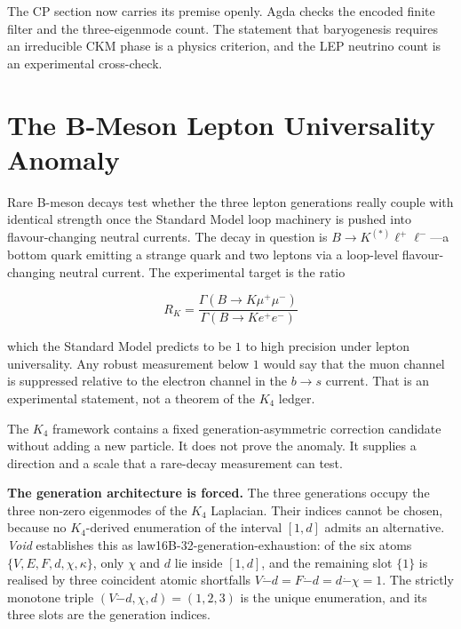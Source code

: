 \documentclass[11pt,a4paper]{book}
\def\texttt#1{#1}%
\begin{document}
The CP section now carries its premise openly.  Agda checks the encoded finite
filter and the three-eigenmode count.  The statement that baryogenesis requires
an irreducible CKM phase is a physics criterion, and the LEP neutrino count is
an experimental cross-check.

\section{The B-Meson Lepton Universality Anomaly}
\label{sec:b-meson-anomaly}

Rare B-meson decays test whether the three lepton generations really couple with identical strength once the Standard Model loop machinery is pushed into flavour-changing neutral currents. The decay in question is $B \to K^{(*)} \ell^+ \ell^-$---a bottom quark emitting a strange quark and two leptons via a loop-level flavour-changing neutral current. The experimental target is the ratio

\[
  R_K = \frac{\Gamma(B \to K \mu^+\mu^-)}{\Gamma(B \to K e^+e^-)}
\]

which the Standard Model predicts to be $1$ to high precision under lepton universality.  Any robust measurement below $1$ would say that the muon channel is suppressed relative to the electron channel in the $b \to s$ current.  That is an experimental statement, not a theorem of the $K_4$ ledger.

The $K_4$ framework contains a fixed generation-asymmetric correction candidate without adding a new particle.  It does not prove the anomaly.  It supplies a direction and a scale that a rare-decay measurement can test.

\textbf{The generation architecture is forced.} The three generations occupy the three non-zero eigenmodes of the $K_4$ Laplacian. Their indices cannot be chosen, because no $K_4$-derived enumeration of the interval $[1, d]$ admits an alternative. \textit{Void} establishes this as \texttt{law16B-32-generation-exhaustion}: of the six atoms $\{V, E, F, d, \chi, \kappa\}$, only $\chi$ and $d$ lie inside $[1, d]$, and the remaining slot $\{1\}$ is realised by three coincident atomic shortfalls $V \dot{-} d = F \dot{-} d = d \dot{-} \chi = 1$. The strictly monotone triple $(V \dot{-} d, \chi, d) = (1, 2, 3)$ is the unique enumeration, and its three slots are the generation indices.
\end{document}
